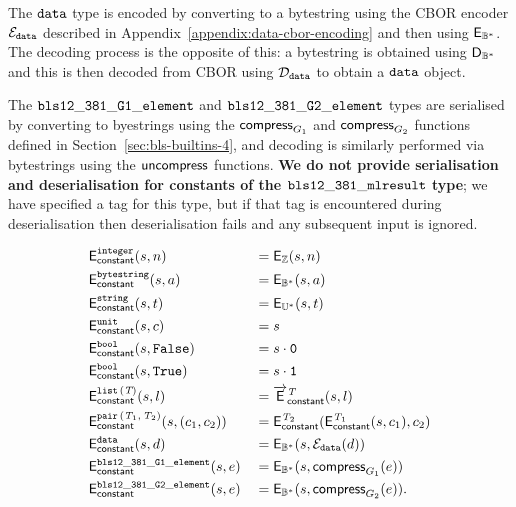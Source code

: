 The $\mathtt{data}$ type is encoded by converting to a bytestring using the CBOR
encoder $\mathcal{E}_{\mathtt{data}}$ described in Appendix~\ref{appendix:data-cbor-encoding} and
then using $\mathsf{E}_{\mathbb{B}^*}$.  The decoding process is the opposite of this: a
bytestring is obtained using $\mathsf{D}_{\mathbb{B}^*}$ and this is then decoded from CBOR
using $\mathcal{D}_{\mathtt{data}}$ to obtain a $\mathtt{data}$ object.

The $\mathtt{bls12\_381\_G1\_element}$ and $\mathtt{bls12\_381\_G2\_element}$ types are
serialised by converting to byestrings using the $\mathsf{compress}_{G_1}$ and
$\mathsf{compress}_{G_2}$ functions defined in
Section~\ref{sec:bls-builtins-4}, and decoding is similarly performed
via bytestrings using the $\mathsf{uncompress}$ functions.  \textbf{We do not provide
serialisation and deserialisation for constants of the
$\mathtt{bls12\_381\_mlresult}$ type}; we have specified a tag for this type, but if
that tag is encountered during deserialisation then deserialisation fails and
any subsequent input is ignored.


\begin{alignat*}{2}
  & \mathsf{E}_{\mathsf{constant}}^{\mathtt{integer}}(s,n)                  &&= \mathsf{E}_{\mathbb{Z}}(s, n) \\
  & \mathsf{E}_{\mathsf{constant}}^{\mathtt{bytestring}}(s,a)               &&= \mathsf{E}_{\mathbb{B}^*}(s, a) \\
  & \mathsf{E}_{\mathsf{constant}}^{\mathtt{string}}(s,t)                   &&= \mathsf{E}_{\mathbb{U}^*}(s, t) \\
  & \mathsf{E}_{\mathsf{constant}}^{\mathtt{unit}}(s,c)                     &&= s  \\
  & \mathsf{E}_{\mathsf{constant}}^{\mathtt{bool}}(s, \texttt{False})       &&= s \cdot \mathtt{0}\\
  & \mathsf{E}_{\mathsf{constant}}^{\mathtt{bool}}(s, \texttt{True})        &&= s \cdot \mathtt{1}\\
  & \mathsf{E}_{\mathsf{constant}}^{\mathtt{list}\,\mathtt{(}\textit{T}\mathtt{)}}(s,l)                  &&= \overrightarrow{\mathsf{E}}^{\textit{T}}_{\mathsf{constant}}(s, l) \\
  & \mathsf{E}_{\mathsf{constant}}^{\mathtt{pair}\,\mathtt{(}\textit{T}_1\mathtt{,}\,\textit{T}_2\mathtt{)}}(s,(c_1,c_2))  &&= \mathsf{E}_{\mathsf{constant}}^{\textit{T}_2}(\mathsf{E}_{\mathsf{constant}}^{\textit{T}_1}(s, c_1), c_2)\\
  & \mathsf{E}_{\mathsf{constant}}^{\mathtt{data}}(s,d)                     &&= \mathsf{E}_{\mathbb{B}^*}(s, \mathcal{E}_{\mathtt{data}}(d))\\
  & \mathsf{E}_{\mathsf{constant}}^{\mathtt{bls12\_381\_G1\_element}}(s,e)  &&= \mathsf{E}_{\mathbb{B}^*}(s, \mathsf{compress}_{G_1}(e))\\
  & \mathsf{E}_{\mathsf{constant}}^{\mathtt{bls12\_381\_G2\_element}}(s,e)  &&= \mathsf{E}_{\mathbb{B}^*}(s, \mathsf{compress}_{G_2}(e)).
\end{alignat*}


